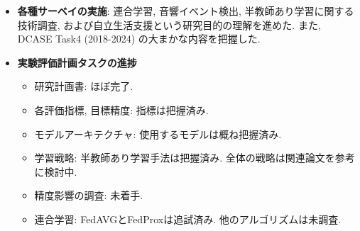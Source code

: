 \documentclass[dvipdfmx, twocolumn, 10pt]{bxjsarticle}
\begin{document}
\begin{itemize}
    \item \textbf{各種サーベイの実施}: 連合学習, 音響イベント検出, 半教師あり学習に関する技術調査, および自立生活支援という研究目的の理解を進めた. また, DCASE Task4 (2018-2024) の大まかな内容を把握した.
    \item \textbf{実験評価計画タスクの進捗}
    \begin{itemize}
        \item 研究計画書: ほぼ完了.
        \item 各評価指標, 目標精度: 指標は把握済み.
        \item モデルアーキテクチャ: 使用するモデルは概ね把握済み.
        \item 学習戦略: 半教師あり学習手法は把握済み. 全体の戦略は関連論文を参考に検討中.
        \item 精度影響の調査: 未着手.
        \item 連合学習: FedAVGとFedProxは追試済み. 他のアルゴリズムは未調査.
    \end{itemize}
\end{itemize}


\printbibliography
\end{document}
